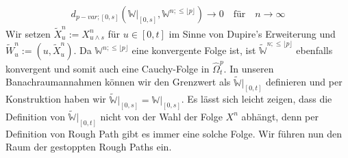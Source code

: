 \documentclass[12pt,titlepage,headsepline]{article}
\begin{document}
      \begin{align*}
        d_{p-var;[0,s]}(\mathbb{W}\rvert_{[0,s]},\mathbb{W}^{n;\leq \lfloor p\rfloor}) \rightarrow 0 \quad \text{für} \quad n \rightarrow \infty
      \end{align*}
      Wir setzen $\tilde{X}_u^n:=X^n_{u \wedge s}$ für $u \in [0,t]$ im Sinne von Dupire's Erweiterung und $\tilde{W}_u^n:=(u,\tilde{X}_u^n)$. Da $\mathbb{W}^{n;\leq \lfloor p\rfloor} $ eine konvergente Folge ist, ist $\tilde{\mathbb{W}}^{n;\leq \lfloor p\rfloor} $ ebenfalls konvergent und somit auch eine Cauchy-Folge in $\hat{\Omega}_t^p$. In unseren Banachraumannahmen können wir den Grenzwert als $\tilde{\mathbb{W}}\rvert_{[0,t]}$ definieren und per Konstruktion haben wir $\tilde{\mathbb{W}}\rvert_{[0,s]}=\mathbb{W}\rvert_{[0,s]}$. Es lässt sich leicht zeigen, dass die Definition von $\tilde{\mathbb{W}}\rvert_{[0,t]}$ nicht von der Wahl der Folge $X^n$ abhängt, denn per Definition von Rough Path gibt es immer eine solche Folge. Wir führen nun den Raum der gestoppten Rough Paths ein.
\end{document}

